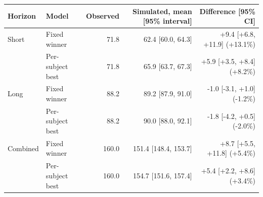 \begin{tabular}{llrrr}
\toprule
Horizon & Model & Observed & Simulated, mean [95\% interval] & Difference [95\% CI] \\
\midrule
Short & Fixed winner & 71.8 & 62.4 [60.0, 64.3] & +9.4 [+6.8, +11.9] (+13.1\%) \\
 & Per-subject best & 71.8 & 65.9 [63.7, 67.3] & +5.9 [+3.5, +8.4] (+8.2\%) \\
\midrule
Long & Fixed winner & 88.2 & 89.2 [87.9, 91.0] & -1.0 [-3.1, +1.0] (-1.2\%) \\
 & Per-subject best & 88.2 & 90.0 [88.0, 92.1] & -1.8 [-4.2, +0.5] (-2.0\%) \\
\midrule
Combined & Fixed winner & 160.0 & 151.4 [148.4, 153.7] & +8.7 [+5.5, +11.8] (+5.4\%) \\
 & Per-subject best & 160.0 & 154.7 [151.6, 157.4] & +5.4 [+2.2, +8.6] (+3.4\%) \\
\bottomrule
\end{tabular}
